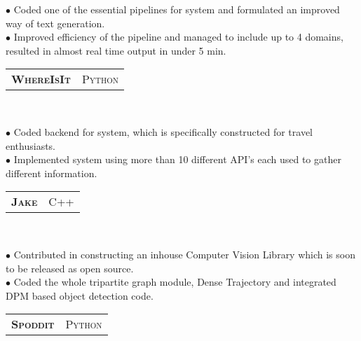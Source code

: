 \documentclass[10pt,letterpaper,oneside]{article}
\begin{document}
    \vspace{-4mm}
    \begin{adjustwidth}{7pt}{0pt}
        {\footnotesize $\bullet$ Coded one of the essential pipelines for system and formulated an improved way of text generation.\\
        $\bullet$ Improved efficiency of the pipeline and managed to include up to 4 domains, resulted in almost real time output in under 5 min. }\\ 
    \end{adjustwidth}
    \vspace{-6pt}
    \begin{tabular}{c|c}
        \textbf{\normalsize W\textsc{here}I\textsc{s}I\textsc{t}}
        &\textmd{\normalsize P\textsc{ython}}
    \end{tabular}\\
     \vspace{-4mm}
    \begin{adjustwidth}{7pt}{0pt}
            {\footnotesize $\bullet$ Coded backend for system, which is specifically constructed for travel enthusiasts.\\ 
            $\bullet$ Implemented system using more than 10 different API's each used to gather different information.}\\ 
    \end{adjustwidth}
    \vspace{-6pt}
    \begin{tabular}{c|c}
        \textbf{\normalsize J\textsc{ake}}
        &\textmd{\normalsize C\textsc{++}}
    \end{tabular}\\
     \vspace{-4mm}
    \begin{adjustwidth}{7pt}{0pt}
        {\footnotesize $\bullet$ Contributed in constructing an inhouse Computer Vision Library which is soon to be released as open source.\\
        $\bullet$ Coded the whole tripartite graph module, Dense Trajectory and integrated DPM based object detection code.}\\
    \end{adjustwidth}
    \vspace{-6pt}
    \begin{tabular}{c|c}
        \textbf{\normalsize S\textsc{poddit}}
        &\textmd{\normalsize P\textsc{ython}}
    \end{tabular}\\
     \vspace{-4mm}
\end{document}
